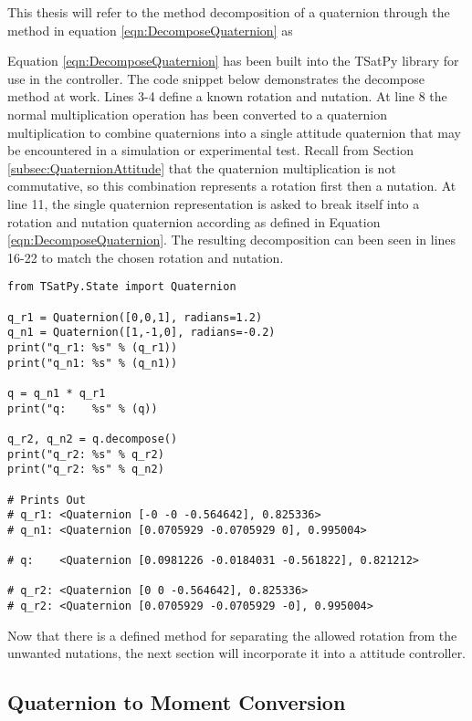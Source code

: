 This thesis will refer to the method decomposition of a quaternion through the method in equation \ref{eqn:DecomposeQuaternion} as


Equation \ref{eqn:DecomposeQuaternion} has been built into the TSatPy library for use in the controller.  The code snippet below demonstrates the decompose method at work.  Lines 3-4 define a known rotation and nutation.  At line 8 the normal multiplication operation has been converted to a quaternion multiplication to combine quaternions into a single attitude quaternion that may be encountered in a simulation or experimental test.  Recall from Section \ref{subsec:QuaternionAttitude} that the quaternion multiplication is not commutative, so this combination represents a rotation first then a nutation.  At line 11, the single quaternion representation is asked to break itself into a rotation and nutation quaternion according as defined in Equation \ref{eqn:DecomposeQuaternion}.  The resulting decomposition can been seen in lines 16-22 to match the chosen rotation and nutation.

\begin{singlespace}
  \begin{verbatim}
from TSatPy.State import Quaternion

q_r1 = Quaternion([0,0,1], radians=1.2)
q_n1 = Quaternion([1,-1,0], radians=-0.2)
print("q_r1: %s" % (q_r1))
print("q_n1: %s" % (q_n1))

q = q_n1 * q_r1
print("q:    %s" % (q))

q_r2, q_n2 = q.decompose()
print("q_r2: %s" % q_r2)
print("q_r2: %s" % q_n2)

# Prints Out
# q_r1: <Quaternion [-0 -0 -0.564642], 0.825336>
# q_n1: <Quaternion [0.0705929 -0.0705929 0], 0.995004>

# q:    <Quaternion [0.0981226 -0.0184031 -0.561822], 0.821212>

# q_r2: <Quaternion [0 0 -0.564642], 0.825336>
# q_r2: <Quaternion [0.0705929 -0.0705929 -0], 0.995004>
  \end{verbatim}
\nocite{minted}
\end{singlespace}

Now that there is a defined method for separating the allowed rotation from the unwanted nutations, the next section will incorporate it into a attitude controller.

\subsection{Quaternion to Moment Conversion}

